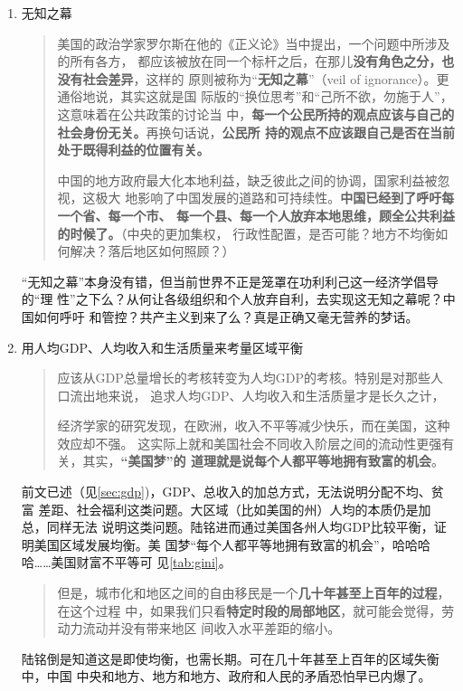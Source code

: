 \begin{enumerate}
\item 无知之幕
  \begin{quotation}
    美国的政治学家罗尔斯在他的《正义论》当中提出，一个问题中所涉及的所有各方，
    都应该被放在同一个标杆之后，在那儿\textbf{没有角色之分，也没有社会差异}，这样的
    原则被称为“\textbf{无知之幕}”（veil of ignorance）。更通俗地说，其实这就是国
    际版的“换位思考”和“己所不欲，勿施于人”，这意味着在公共政策的讨论当
    中，\textbf{每一个公民所持的观点应该与自己的社会身份无关。}再换句话说，\textbf{公民所
      持的观点不应该跟自己是否在当前处于既得利益的位置有关。}


    中国的地方政府最大化本地利益，缺乏彼此之间的协调，国家利益被忽视，这极大
    地影响了中国发展的道路和可持续性。\textbf{中国已经到了呼吁每一个省、每一个市、
      每一个县、每一个人放弃本地思维，顾全公共利益的时候了。}（中央的更加集权，
    行政性配置，是否可能？地方不均衡如何解决？落后地区如何照顾？）
  \end{quotation}

  “无知之幕”本身没有错，但当前世界不正是笼罩在功利利己这一经济学倡导的“理
  性”之下么？从何让各级组织和个人放弃自利，去实现这无知之幕呢？中国如何呼吁
  和管控？共产主义到来了么？真是正确又毫无营养的梦话。

\item 用人均GDP、人均收入和生活质量来考量区域平衡

  \begin{quotation}
    应该从GDP总量增长的考核转变为人均GDP的考核。特别是对那些人口流出地来说，
    追求人均GDP、人均收入和生活质量才是长久之计，

    经济学家的研究发现，在欧洲，收入不平等减少快乐，而在美国，这种效应却不强。
    这实际上就和美国社会不同收入阶层之间的流动性更强有关，其实，\textbf{“美国梦”的
    道理就是说每个人都平等地拥有致富的机会}。
  \end{quotation}

  前文已述（见\cref{sec:gdp})，GDP、总收入的加总方式，无法说明分配不均、贫富
  差距、社会福利这类问题。大区域（比如美国的州）人均的本质仍是加总，同样无法
  说明这类问题。陆铭进而通过美国各州人均GDP比较平衡，证明美国区域发展均衡。美
  国梦“每个人都平等地拥有致富的机会”，哈哈哈哈……美国财富不平等可
  见\cref{tab:gini}。

  \begin{quotation}
  但是，城市化和地区之间的自由移民是一个\textbf{几十年甚至上百年的过程}，在这个过程
  中，如果我们只看\textbf{特定时段的局部地区}，就可能会觉得，劳动力流动并没有带来地区
  间收入水平差距的缩小。
  \end{quotation}
  陆铭倒是知道这是即使均衡，也需长期。可在几十年甚至上百年的区域失衡中，中国
  中央和地方、地方和地方、政府和人民的矛盾恐怕早已内爆了。


\end{enumerate}
